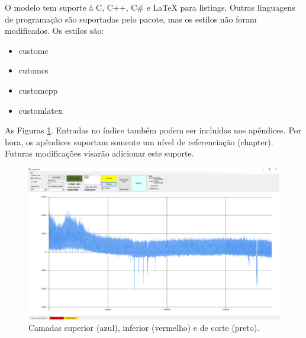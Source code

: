 	O modelo tem suporte à C, C++, C\# e LaTeX para listings. Outras linguagens de programação são suportadas pelo pacote, mas os estilos não foram modificados. Os estilos são:

	\begin{itemize}
		\item customc
		\item cutomcs
		\item customcpp
		\item customlatex
	\end{itemize}

	

	

\label{app:gerbers}

	As Figuras \ref{img:gerbers:topbot}. Entradas no índice também podem ser incluídas nos apêndices. Por hora, os apêndices suportam somente um nível de referenciação (chapter). Futuras modificações visarão adicionar este suporte.

	\begin{figure}[h]
		\caption{Camadas superior (azul), inferior (vermelho) e de corte (preto).}
		\label{img:gerbers:topbot}
		\centering
		\includegraphics[width=0.3\linewidth,center]{images/appinaqcuisitionmode}
	\end{figure}
